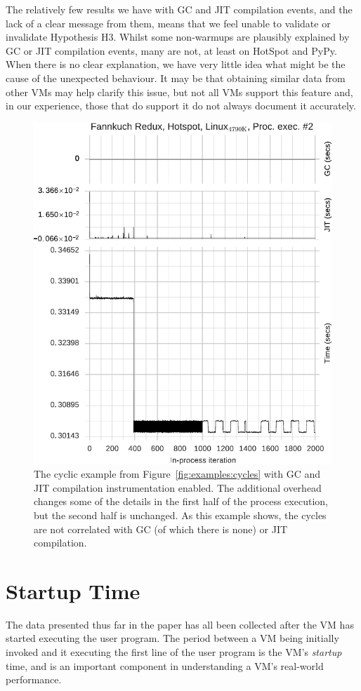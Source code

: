 \documentclass[preprint,numbers,10pt]{sigplanconf}
\begin{document}
The relatively few results we have with GC and JIT compilation events, and the lack of a clear
message from them, means that we feel unable to validate or invalidate
Hypothesis H3. Whilst some non-warmups are plausibly explained by GC or JIT compilation events, many are not, at
least on HotSpot and PyPy. When there is no clear explanation, we have very little idea what might be
the cause of the unexpected behaviour. It may be that obtaining similar data
from other VMs may help clarify this issue, but not all VMs support this
feature and, in our experience, those that do support it do not always
document it accurately.

\begin{figure}[tbp]
\centering
\includegraphics[width=.45\textwidth]{examples/new_good_comp.pdf}
\caption{The cyclic example from Figure~\ref{fig:examples:cycles} with
GC and JIT compilation instrumentation enabled. The additional overhead
changes some of the details in the first half of the process
execution, but the second half is unchanged. As this example shows, the
cycles are not correlated with GC (of which there is none) or JIT compilation.}
\label{fig:goodcomp}
\vspace{-.2cm}
\end{figure}

\section{Startup Time}
\label{sec:startup}

The data presented thus far in the paper has all been collected after the VM has
started executing the user program. The period between a VM being initially
invoked and it executing the first line of the user program is the VM's \emph{startup} time,
and is an important component in understanding a VM's real-world performance.
\end{document}
